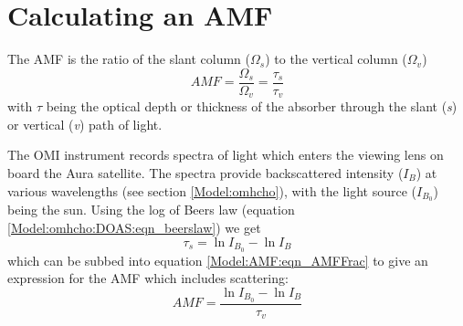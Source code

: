 \section{Calculating an AMF}
  \label{Model:AMF}
  
  The AMF is the ratio of the slant column ($\Omega_s$) to the vertical column ($\Omega_v$)
  \begin{equation} \label{Model:AMF:eqn_AMFFrac}
    AMF=\frac{\Omega_s}{\Omega_v} = \frac{\tau_s}{\tau_v}
  \end{equation}
  with $\tau$ being the optical depth or thickness of the absorber through the slant (\textit{s}) or vertical (\textit{v}) path of light.
  
  
  The OMI instrument records spectra of light which enters the viewing lens on board the Aura satellite.
  The spectra provide backscattered intensity ($I_B$) at various wavelengths (see section \ref{Model:omhcho}), with the light source ($I_{B_0}$) being the sun. 
  Using the log of Beers law (equation \ref{Model:omhcho:DOAS:eqn_beerslaw}) we get 
  $$ \tau_s = \ln{I_{B_0}} - \ln{I_B} $$
  which can be subbed into equation \ref{Model:AMF:eqn_AMFFrac} to give an expression for the AMF which includes scattering:
  \begin{equation} \label{Model:AMF:eqn_amfscattering}
    AMF = \frac{\ln{I_{B_0}}-\ln{I_B}}{\tau_v}
  \end{equation}
  
